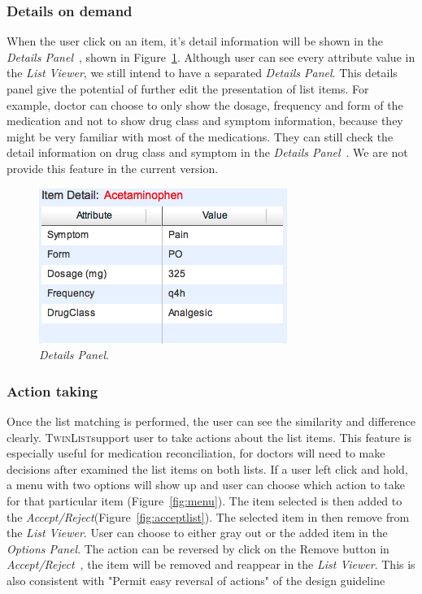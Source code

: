 \documentclass{chi2009}
\newcommand{\TwinList}{\textsc{TwinList}}
\newcommand{\ListViewer}{\textit{List Viewer}}
\newcommand{\AcceptReject}{\textit{Accept/Reject}}
\newcommand{\Details}{\textit{Details Panel}}
\newcommand{\Options}{\textit{Options Panel}}
\begin{document}
\subsubsection{Details on demand}
When the user click on an item, it's detail information will be shown in the \Details~, shown in Figure~\ref{fig:details}. Although user can see every attribute value in the \ListViewer, we still intend to have a separated \Details. This details panel give the potential of further edit the presentation of list items. For example, doctor can choose to only show the dosage, frequency and form of the medication and not to show drug class and symptom information, because they might be very familiar with most of the medications. They can still check the detail information on drug class and symptom in the  \Details~. We are not provide this feature in the current version.

\begin{figure}[t]
\begin{center}
\includegraphics[width=1\linewidth]{img/details.png}
\end{center}
   \caption{\Details.}
   \label{fig:details}
\end{figure}

\subsubsection{Action taking}

Once the list matching is performed, the user can see the similarity and difference clearly. \TwinList support user to take actions about the list items. This feature is especially useful for medication reconciliation, for doctors will need to make decisions after examined the list items on both lists. If a user left click and hold, a menu with two options will show up and user can choose which action to take for that particular item (Figure~\ref{fig:menu}). The item selected is then added to the \AcceptReject (Figure~\ref{fig:acceptlist}). The selected item in then remove from the \ListViewer. User can choose to either gray out or the added item in the \Options. 
The action can be reversed by click on the Remove button in \AcceptReject~, the item will be removed and reappear in the \ListViewer. This is also consistent with "Permit easy reversal of actions" \cite{shneiderman}of the design guideline
\end{document}
